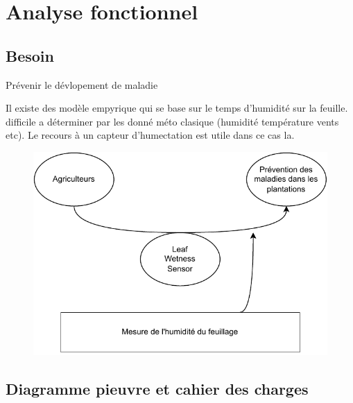 \graphicspath{ {./figuresAnalysis} }
\section{Analyse fonctionnel}
\subsection{Besoin}
Prévenir le dévlopement de maladie

Il existe des modèle empyrique qui se base sur le temps d'humidité sur la feuille. difficile a déterminer par les donné méto clasique (humidité température vents etc). Le recours à un capteur d'humectation est utile dans ce cas la.

\begin{figure}[!ht]
 \centering
 \includegraphics{DiagrammeCorne.drawio.pdf}
\end{figure}

\subsection{Diagramme pieuvre et cahier des charges}

